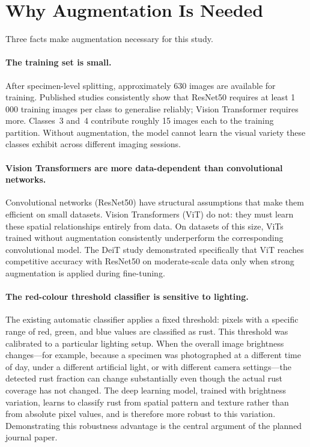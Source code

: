 \documentclass[11pt,a4paper]{article}
\begin{document}
\section{Why Augmentation Is Needed}
\label{sec:motivation}

Three facts make augmentation necessary for this study.

\paragraph{The training set is small.}
After specimen-level splitting, approximately 630 images are available for training. Published studies consistently show that ResNet50 requires at least 1\,000 training images per class to generalise reliably; Vision Transformer requires more. Classes~3 and~4 contribute roughly 15 images each to the training partition. Without augmentation, the model cannot learn the visual variety these classes exhibit across different imaging sessions.

\paragraph{Vision Transformers are more data-dependent than convolutional networks.}
Convolutional networks (ResNet50) have structural assumptions that make them efficient on small datasets. Vision Transformers (ViT) do not: they must learn these spatial relationships entirely from data. On datasets of this size, ViTs trained without augmentation consistently underperform the corresponding convolutional model. The DeiT study \cite{touvron2021} demonstrated specifically that ViT reaches competitive accuracy with ResNet50 on moderate-scale data only when strong augmentation is applied during fine-tuning.

\paragraph{The red-colour threshold classifier is sensitive to lighting.}
The existing automatic classifier applies a fixed threshold: pixels with a specific range of red, green, and blue values are classified as rust. This threshold was calibrated to a particular lighting setup. When the overall image brightness changes---for example, because a specimen was photographed at a different time of day, under a different artificial light, or with different camera settings---the detected rust fraction can change substantially even though the actual rust coverage has not changed. The deep learning model, trained with brightness variation, learns to classify rust from spatial pattern and texture rather than from absolute pixel values, and is therefore more robust to this variation. Demonstrating this robustness advantage is the central argument of the planned journal paper.
\end{document}
